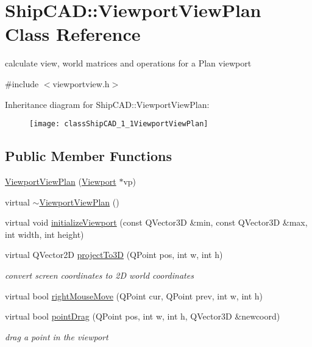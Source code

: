 \hypertarget{classShipCAD_1_1ViewportViewPlan}{}\section{Ship\+C\+AD\+:\+:Viewport\+View\+Plan Class Reference}
\label{classShipCAD_1_1ViewportViewPlan}


calculate view, world matrices and operations for a Plan viewport  




{\ttfamily \#include $<$viewportview.\+h$>$}

Inheritance diagram for Ship\+C\+AD\+:\+:Viewport\+View\+Plan\+:\begin{figure}[H]
\begin{center}
\leavevmode
\texttt{[image: classShipCAD\_1\_1ViewportViewPlan]}
\end{center}
\end{figure}
\subsection*{Public Member Functions}
\begin{DoxyCompactItemize}
\item 
\hyperlink{classShipCAD_1_1ViewportViewPlan_a71852fca01ee2c986927f15b37246567}{Viewport\+View\+Plan} (\hyperlink{classShipCAD_1_1Viewport}{Viewport} $\ast$vp)
\item 
virtual \hyperlink{classShipCAD_1_1ViewportViewPlan_aa00e0a2e6845f8c1382ab834879c2bfd}{$\sim$\+Viewport\+View\+Plan} ()
\item 
virtual void \hyperlink{classShipCAD_1_1ViewportViewPlan_a05836d5f48d28a0681a1a3214dc4aeac}{initialize\+Viewport} (const Q\+Vector3D \&min, const Q\+Vector3D \&max, int width, int height)
\item 
virtual Q\+Vector2D \hyperlink{classShipCAD_1_1ViewportViewPlan_adcc5e44591098694df045848798be804}{project\+To3D} (Q\+Point pos, int w, int h)
\begin{DoxyCompactList}\small\item\em convert screen coordinates to 2D world coordinates \end{DoxyCompactList}\item 
virtual bool \hyperlink{classShipCAD_1_1ViewportViewPlan_a932d06d121e39a91676053c667fc78d5}{right\+Mouse\+Move} (Q\+Point cur, Q\+Point prev, int w, int h)
\item 
virtual bool \hyperlink{classShipCAD_1_1ViewportViewPlan_aaac7978a626640198a7a92daae63bc51}{point\+Drag} (Q\+Point pos, int w, int h, Q\+Vector3D \&newcoord)
\begin{DoxyCompactList}\small\item\em drag a point in the viewport \end{DoxyCompactList}\end{DoxyCompactItemize}
